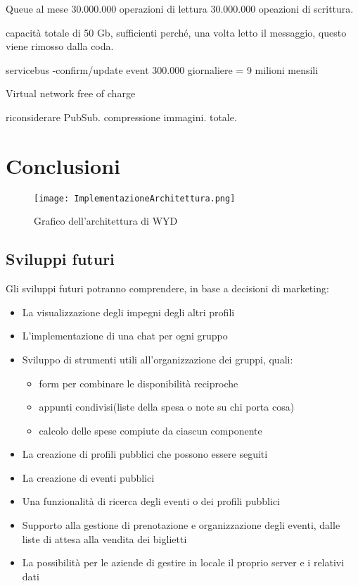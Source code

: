 Queue
al mese 30.000.000 operazioni di lettura
30.000.000 opeazioni di scrittura.

capacità totale di 50 Gb, sufficienti perché, 
una volta letto il messaggio, questo viene rimosso dalla coda.

servicebus
-confirm/update event 300.000 giornaliere = 9 milioni mensili



Virtual network 
free of charge

riconsiderare PubSub. 
compressione immagini.
totale.

\clearpage
\chapter*{Conclusioni}

\begin{figure}[htbp]
    \begin{center}
        \texttt{[image: ImplementazioneArchitettura.png]}
        \caption{Grafico dell'architettura di WYD}
    \end{center}
\end{figure}
\clearpage

\section{Sviluppi futuri}
Gli sviluppi futuri potranno comprendere, in base a decisioni di marketing:
\begin{itemize}
    \item La visualizzazione degli impegni degli altri profili
    \item L'implementazione di una chat per ogni gruppo
    \item Sviluppo di strumenti utili all'organizzazione dei gruppi, quali:
          \begin{itemize}
              \item form per combinare le disponibilità reciproche
              \item appunti condivisi(liste della spesa o note su chi porta cosa)
              \item calcolo delle spese compiute da ciascun componente
          \end{itemize}
    \item La creazione di profili pubblici che possono essere seguiti
    \item La creazione di eventi pubblici
    \item Una funzionalità di ricerca degli eventi o dei profili pubblici
    \item Supporto alla gestione di prenotazione e organizzazione degli eventi, dalle liste di attesa alla vendita dei biglietti
    \item La possibilità per le aziende di gestire in locale il proprio server e i relativi dati
\end{itemize}
\clearpage


